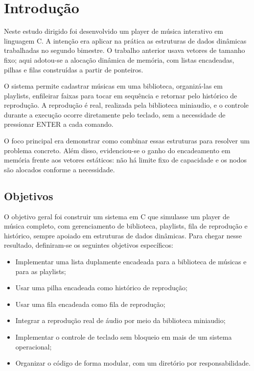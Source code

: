 \documentclass[
    12pt
    ,oneside
    ,a4paper
    ,chapter=TITLE
    ,section=TITLE
    ,sumario=abnt-6027-2012]{abntex2}
\begin{document}
\sumario

\textual

\chapter{Introdução}
\label{cap:introducao}

Neste estudo dirigido foi desenvolvido um player de música interativo em linguagem C. A intenção era aplicar na prática as estruturas de dados dinâmicas trabalhadas no segundo bimestre. O trabalho anterior usava vetores de tamanho fixo; aqui adotou-se a alocação dinâmica de memória, com listas encadeadas, pilhas e filas construídas a partir de ponteiros.

O sistema permite cadastrar músicas em uma biblioteca, organizá-las em playlists, enfileirar faixas para tocar em sequência e retornar pelo histórico de reprodução. A reprodução é real, realizada pela biblioteca miniaudio, e o controle durante a execução ocorre diretamente pelo teclado, sem a necessidade de pressionar ENTER a cada comando.

O foco principal era demonstrar como combinar essas estruturas para resolver um problema concreto. Além disso, evidenciou-se o ganho do encadeamento em memória frente aos vetores estáticos: não há limite fixo de capacidade e os nodos são alocados conforme a necessidade.

\section{Objetivos}

O objetivo geral foi construir um sistema em C que simulasse um player de música completo, com gerenciamento de biblioteca, playlists, fila de reprodução e histórico, sempre apoiado em estruturas de dados dinâmicas. Para chegar nesse resultado, definiram-se os seguintes objetivos específicos:

\begin{itemize}
    \item Implementar uma lista duplamente encadeada para a biblioteca de músicas e para as playlists;
    \item Usar uma pilha encadeada como histórico de reprodução;
    \item Usar uma fila encadeada como fila de reprodução;
    \item Integrar a reprodução real de áudio por meio da biblioteca miniaudio;
    \item Implementar o controle de teclado sem bloqueio em mais de um sistema operacional;
    \item Organizar o código de forma modular, com um diretório por responsabilidade.
\end{itemize}
\end{document}
